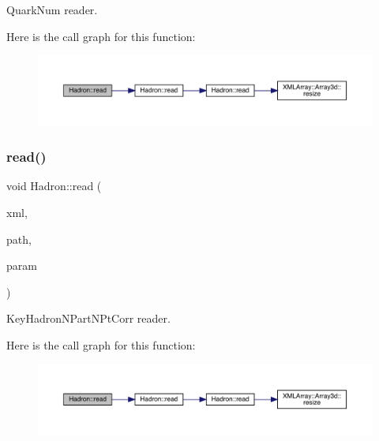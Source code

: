 Quark\+Num reader. 

Here is the call graph for this function\+:\nopagebreak
\begin{figure}[H]
\begin{center}
\leavevmode
\includegraphics[width=350pt]{d1/daf/namespaceHadron_a1f04a3926b07155fbf7e7887169d7f4e_cgraph}
\end{center}
\end{figure}
\mbox{\label{namespaceHadron_a85b27e940a60880e6f98fb6a939d96c2}} 
\subsubsection{\texorpdfstring{read()}{read()}\hspace{0.1cm}{\footnotesize\ttfamily [20/94]}}
{\footnotesize\ttfamily void Hadron\+::read (\begin{DoxyParamCaption}\item[{\mbox{\hyperlink{classADATXML_1_1XMLReader}{X\+M\+L\+Reader}} \&}]{xml,  }\item[{const std\+::string \&}]{path,  }\item[{\mbox{\hyperlink{structHadron_1_1KeyHadronNPartNPtCorr__t}{Key\+Hadron\+N\+Part\+N\+Pt\+Corr\+\_\+t}} \&}]{param }\end{DoxyParamCaption})}



Key\+Hadron\+N\+Part\+N\+Pt\+Corr reader. 

Here is the call graph for this function\+:\nopagebreak
\begin{figure}[H]
\begin{center}
\leavevmode
\includegraphics[width=350pt]{d1/daf/namespaceHadron_a85b27e940a60880e6f98fb6a939d96c2_cgraph}
\end{center}
\end{figure}
\mbox{\label{namespaceHadron_ab1a8a0ffcdeeae3ff66ed453c1609de7}} 
